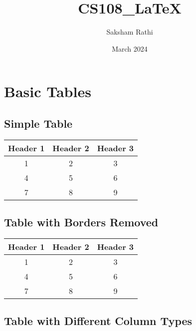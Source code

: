 \documentclass{article}
\title{CS108\_LaTeX}
\author{Saksham Rathi}
\date{March 2024}
\begin{document}
\maketitle

\section{Basic Tables}

\subsection{Simple Table}

\begin{tabular}{|c|c|c|}
\hline
Header 1 & Header 2 & Header 3 \\
\hline
1 & 2 & 3 \\
4 & 5 & 6 \\
7 & 8 & 9 \\
\hline
\end{tabular}

\subsection{Table with Borders Removed}

\begin{tabular}{ccc}
\hline
Header 1 & Header 2 & Header 3 \\
\hline
1 & 2 & 3 \\
4 & 5 & 6 \\
7 & 8 & 9 \\
\hline
\end{tabular}

\subsection{Table with Different Column Types}
\end{document}
